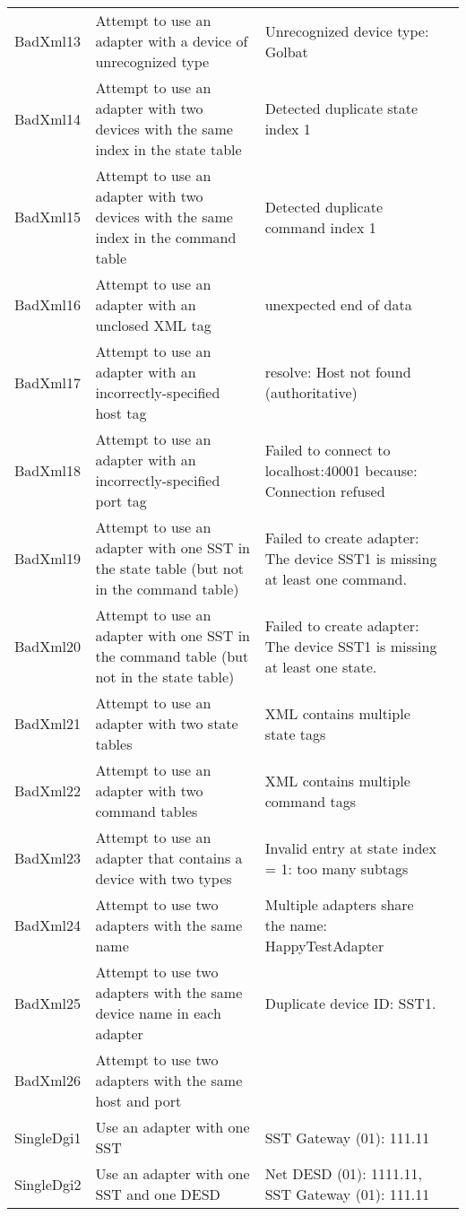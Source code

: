 \documentclass{article}
\begin{document}
\begin{center}
\begin{footnotesize}
\begin{longtable}{|p{3cm}|p{7cm}|p{7cm}|c|}
    BadXml13 & Attempt to use an adapter with a device of unrecognized type & Unrecognized device type: Golbat & \\
    BadXml14 & Attempt to use an adapter with two devices with the same index in the state table & Detected duplicate state index 1 & \\
    BadXml15 & Attempt to use an adapter with two devices with the same index in the command table & Detected duplicate command index 1 & \\
    BadXml16 & Attempt to use an adapter with an unclosed XML tag & unexpected end of data & \\
    BadXml17 & Attempt to use an adapter with an incorrectly-specified host tag & resolve: Host not found (authoritative) & \\
    BadXml18 & Attempt to use an adapter with an incorrectly-specified port tag & Failed to connect to localhost:40001 because: Connection refused & \\
    BadXml19 & Attempt to use an adapter with one SST in the state table (but not in the command table) & Failed to create adapter: The device SST1 is missing at least one command. & \\
    BadXml20 & Attempt to use an adapter with one SST in the command table (but not in the state table) & Failed to create adapter: The device SST1 is missing at least one state. & \\
    BadXml21 & Attempt to use an adapter with two state tables & XML contains multiple state tags & \\
    BadXml22 & Attempt to use an adapter with two command tables & XML contains multiple command tags & \\
    BadXml23 & Attempt to use an adapter that contains a device with two types & Invalid entry at state index = 1: too many subtags & \\
    BadXml24 & Attempt to use two adapters with the same name & Multiple adapters share the name: HappyTestAdapter & \\
    BadXml25 & Attempt to use two adapters with the same device name in each adapter & Duplicate device ID: SST1. & \\
    BadXml26 & Attempt to use two adapters with the same host and port & & \\
    SingleDgi1 & Use an adapter with one SST & SST Gateway (01): 111.11 & \\
    SingleDgi2 & Use an adapter with one SST and one DESD & Net DESD (01): 1111.11, SST Gateway (01): 111.11 & \\

\end{longtable}
\end{footnotesize}
\end{center}
\end{document}
